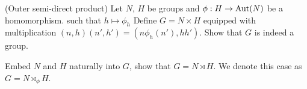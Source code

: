 \begin{theorem}{(Outer semi-direct product)}
	Let $N$, $H$ be groups and $\phi : H \rightarrow \text{Aut}(N)$ be a homomorphism. such that $h \mapsto \phi_h$ Define $G = N \times H$ equipped with multiplication $(n,h)(n',h') = (n\phi_h(n'),hh')$. Show that $G$ is indeed a group.
	
	Embed $N$ and $H$ naturally into $G$, show that $G = N \rtimes H$. We denote this case as $G = N \rtimes_\phi H$.
\end{theorem}











